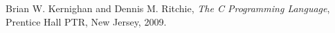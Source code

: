 \documentclass{article}
\begin{document}
\begin{thebibliography}{9}

  Brian W. Kernighan and Dennis M. Ritchie,
  \emph{The C Programming Language},
  Prentice Hall PTR, New Jersey,
  2009.

\end{thebibliography}
\end{document}
